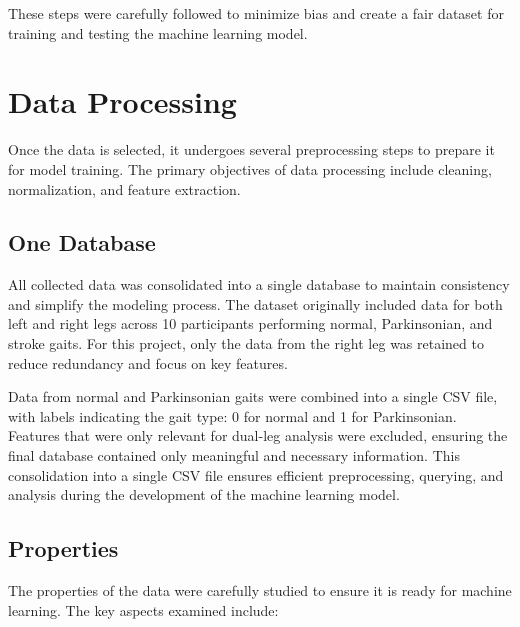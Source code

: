 These steps were carefully followed to minimize bias and create a fair dataset for training and testing the machine learning model.



\section{Data Processing}

Once the data is selected, it undergoes several preprocessing steps to prepare it for model training. The primary objectives of data processing include cleaning, normalization, and feature extraction.

\subsection{One Database}
All collected data was consolidated into a single database to maintain consistency and simplify the modeling process. The dataset originally included data for both left and right legs across 10 participants performing normal, Parkinsonian, and stroke gaits. For this project, only the data from the right leg was retained to reduce redundancy and focus on key features.

Data from normal and Parkinsonian gaits were combined into a single CSV file, with labels indicating the gait type: 0 for normal and 1 for Parkinsonian. Features that were only relevant for dual-leg analysis were excluded, ensuring the final database contained only meaningful and necessary information. This consolidation into a single CSV file ensures efficient preprocessing, querying, and analysis during the development of the machine learning model.

\subsection{Properties}

The properties of the data were carefully studied to ensure it is ready for machine learning. The key aspects examined include:

